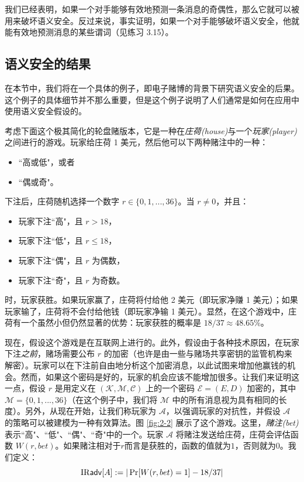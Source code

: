 我们已经表明，如果一个对手能够有效地预测一条消息的奇偶性，那么它就可以被用来破坏语义安全。反过来说，事实证明，如果一个对手能够破坏语义安全，他就能有效地预测消息的某些谓词（见练习 3.15）。

\subsection{语义安全的结果}\label{subsec:2-2-4}

在本节中，我们将在一个具体的例子，即电子赌博的背景下研究语义安全的后果。这个例子的具体细节并不那么重要，但是这个例子说明了人们通常是如何在应用中使用语义安全假设的。

考虑下面这个极其简化的轮盘赌版本，它是一种在\emph{庄荷(house)}与一个\emph{玩家(player)}之间进行的游戏。玩家给庄荷 1 美元，然后他可以下两种赌注中的一种：
\begin{itemize}
	\item ``高或低"，或者
	\item ``偶或奇"。
\end{itemize}
下注后，庄荷随机选择一个数字 $r\in\{0,1,...,36\}$。当 $r\neq 0$，并且：
\begin{itemize}
	\item 玩家下注``高"，且 $r>18$，
	\item 玩家下注``低"，且 $r\leq18$，
	\item 玩家下注``偶"，且 $r$ 为偶数，
	\item 玩家下注``奇"，且 $r$ 为奇数。
\end{itemize}
时，玩家获胜。如果玩家赢了，庄荷将付给他 2 美元（即玩家净赚 1 美元）；如果玩家输了，庄荷将不会付给他钱（即玩家净输 1 美元）。显然，在这个游戏中，庄荷有一个虽然小但仍然显著的优势：玩家获胜的概率是 $18/37\approx48.65\%$。

现在，假设这个游戏是在互联网上进行的。此外，假设由于各种技术原因，在玩家下注\emph{之前}，赌场需要公布 $r$ 的加密（也许是由一些与赌场共享密钥的监管机构来解密）。玩家可以在下注前自由地分析这个加密消息，以此试图来增加他赢钱的机会。然而，如果这个密码是好的，玩家的机会应该不能增加很多。让我们来证明这一点，假设 $r$ 是用定义在 $(\mathcal{K},\mathcal{M},\mathcal{C})$ 上的一个密码 $\mathcal{E}=(E,D)$ 加密的，其中 $\mathcal{M}=\{0,1,...,36\}$（在这个例子中，我们将 $\mathcal{M}$ 中的所有消息视为具有相同的长度）。另外，从现在开始，让我们称玩家为 $\mathcal{A}$，以强调玩家的对抗性，并假设 $\mathcal{A}$ 的策略可以被建模为一种有效算法。图 \ref{fig:2-2} 展示了这个游戏。这里，\emph{赌注(bet)}表示``高"、``低"、``偶"、``奇"中的一个。玩家 $\mathcal{A}$ 将赌注发送给庄荷，庄荷会评估函数 $W(r,bet)$。如果赌注相对于$r$而言是获胜的，函数的值就为$1$，否则就为$0$。我们定义：
$$
{\rm IR\mathsf{adv}}[A]:=|\Pr[W (r,bet)=1]-{18}/{37}|
$$

